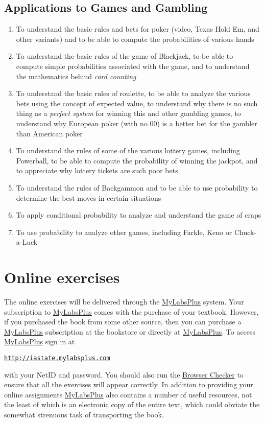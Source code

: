 \documentclass[11pt]{article}
\begin{document}
\subsection{Applications to Games and Gambling}
\begin{enumerate}
\item To understand the basic rules and bets for poker
(video, Texas Hold Em, and other variants)
and to be able to compute the probabilities of various hands
\item To understand the basic rules of the game of Blackjack,
to be able to compute simple probabilities associated with the game,
and to understand the mathematics behind {\em card counting}
\item To understand the basic rules of roulette,
to be able to analyze the various bets using the concept of expected value,
to understand why there is no such thing as a {\em perfect system}
for winning this and other gambling games,
to understand why European poker (with no 00)
is a better bet for the gambler than American poker
\item To understand the rules of some of the various lottery games,
including Powerball,
to be able to compute the probability of winning the jackpot,
and to appreciate why lottery tickets are such poor bets
\item To understand the rules of Backgammon and to be able to use
probability to determine the best moves in certain situations
\item To apply conditional probability to analyze
and understand the game of craps
\item To use probability to analyze other games,
including Farkle, Keno or Chuck-a-Luck
\end{enumerate}

\section{Online exercises}\label{Online}
The online exercises will be delivered through the
\href{http://iastate.mylabsplus.com}{MyLabsPlus} system.
Your subscription to 
\href{http://iastate.mylabsplus.com}{MyLabsPlus}
comes with the purchase of your textbook.
However, if you purchased the book from some other source,
then you can purchase a 
\href{http://iastate.mylabsplus.com}{MyLabsPlus}
subscription at the bookstore or directly at
\href{http://iastate.mylabsplus.com}{MyLabsPlus}.
To access
\href{http://iastate.mylabsplus.com}{MyLabsPlus}
sign in at
\begin{center}
\href{http://iastate.mylabsplus.com}{\tt http://iastate.mylabsplus.com}
\end{center}
with your NetID and password.
You should also run the
\href{https://www.mathxl.com/BrowserCheck/BrowserCheck.aspx?appproductid=3&courseid=2744761&handler_urn=pearson%2fmlp_mml_xl%2fslink%2fx-pearson-mlp_mml_xl&productid=ccng}{Browser Checker}
to ensure that all the exercises will appear correctly.
In addition to providing your online assignments
\href{http://iastate.mylabsplus.com}{MyLabsPlus}
also contains a number of useful resources, not the least of which is an
electronic copy of the entire text, which could obviate
the somewhat strenuous task of transporting the book.
\end{document}
